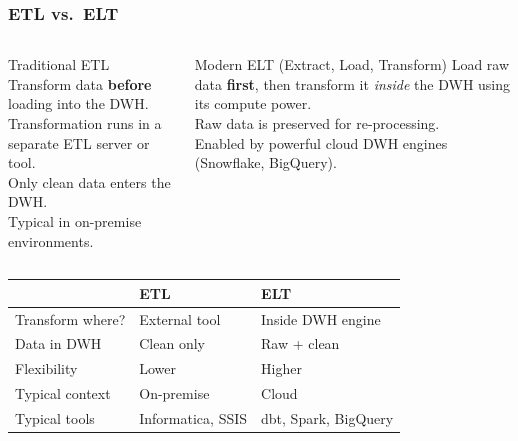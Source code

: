 \begin{frame}
  \frametitle{ETL vs.\ ELT}

  \begin{columns}[T]
    \begin{block}{Traditional ETL}
      Transform data \textbf{before} loading into the DWH.\\
      Transformation runs in a separate ETL server or tool.\\
      Only clean data enters the DWH.\\
      Typical in on-premise environments.
    \end{block}

    \begin{block}{Modern ELT (Extract, Load, Transform)}
      Load raw data \textbf{first}, then transform it \textit{inside}
      the DWH using its compute power.\\
      Raw data is preserved for re-processing.\\
      Enabled by powerful cloud DWH engines (Snowflake, BigQuery).
    \end{block}
  \end{columns}

  \vspace{0.5em}
  \begin{tabularx}{\linewidth}{@{}l X X@{}}
    \toprule
    & \textbf{ETL}                & \textbf{ELT} \\
    \midrule
    Transform where? & External tool         & Inside DWH engine \\
    Data in DWH      & Clean only            & Raw + clean \\
    Flexibility      & Lower                 & Higher \\
    Typical context  & On-premise            & Cloud \\
    Typical tools    & Informatica, SSIS     & dbt, Spark, BigQuery \\
    \bottomrule
  \end{tabularx}
\end{frame}



